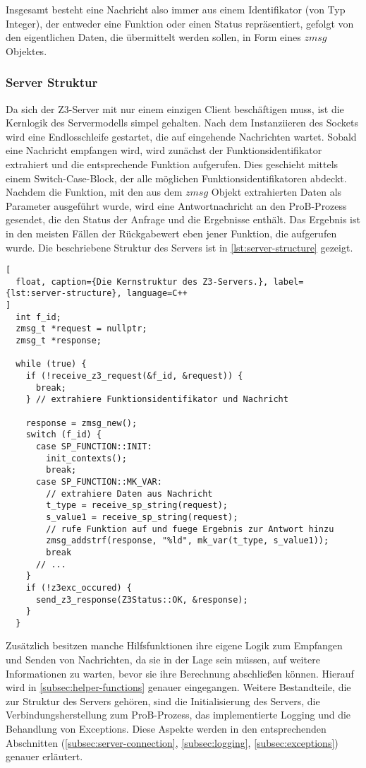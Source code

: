 Insgesamt besteht eine Nachricht also immer aus einem Identifikator (von Typ Integer), der entweder eine Funktion oder einen Status repräsentiert,
gefolgt von den eigentlichen Daten, die übermittelt werden sollen, in Form eines $zmsg$ Objektes.

\subsubsection{Server Struktur}

Da sich der Z3-Server mit nur einem einzigen Client beschäftigen muss, ist die Kernlogik des Servermodells simpel gehalten.
Nach dem Instanziieren des Sockets wird eine Endlosschleife gestartet, die auf eingehende Nachrichten wartet.
Sobald eine Nachricht empfangen wird, wird zunächst der Funktionsidentifikator extrahiert und die entsprechende Funktion aufgerufen.
Dies geschieht mittels einem Switch-Case-Block, der alle möglichen Funktionsidentifikatoren abdeckt.
Nachdem die Funktion, mit den aus dem $zmsg$ Objekt extrahierten Daten als Parameter ausgeführt wurde,
wird eine Antwortnachricht an den ProB-Prozess gesendet, die den Status der Anfrage und die Ergebnisse enthält.
Das Ergebnis ist in den meisten Fällen der Rückgabewert eben jener Funktion, die aufgerufen wurde.
Die beschriebene Struktur des Servers ist in \cref{lst:server-structure} gezeigt.

\begin{lstlisting}[
  float, caption={Die Kernstruktur des Z3-Servers.}, label={lst:server-structure}, language=C++
]
  int f_id;
  zmsg_t *request = nullptr;
  zmsg_t *response;

  while (true) {
    if (!receive_z3_request(&f_id, &request)) {
      break;
    } // extrahiere Funktionsidentifikator und Nachricht

    response = zmsg_new();
    switch (f_id) {
      case SP_FUNCTION::INIT:
        init_contexts();
        break;
      case SP_FUNCTION::MK_VAR:
        // extrahiere Daten aus Nachricht
        t_type = receive_sp_string(request);
        s_value1 = receive_sp_string(request);
        // rufe Funktion auf und fuege Ergebnis zur Antwort hinzu
        zmsg_addstrf(response, "%ld", mk_var(t_type, s_value1));
        break
      // ...
    }
    if (!z3exc_occured) {
      send_z3_response(Z3Status::OK, &response);
    }
  }
\end{lstlisting}

Zusätzlich besitzen manche Hilfsfunktionen ihre eigene Logik zum Empfangen und Senden von Nachrichten,
da sie in der Lage sein müssen, auf weitere Informationen zu warten, bevor sie ihre Berechnung abschließen können.
Hierauf wird in \cref{subsec:helper-functions} genauer eingegangen.
Weitere Bestandteile, die zur Struktur des Servers gehören, sind die Initialisierung des Servers, die Verbindungsherstellung zum ProB-Prozess,
das implementierte Logging und die Behandlung von Exceptions.
Diese Aspekte werden in den entsprechenden Abschnitten (\cref{subsec:server-connection}, \cref{subsec:logging}, \cref{subsec:exceptions}) genauer erläutert.

